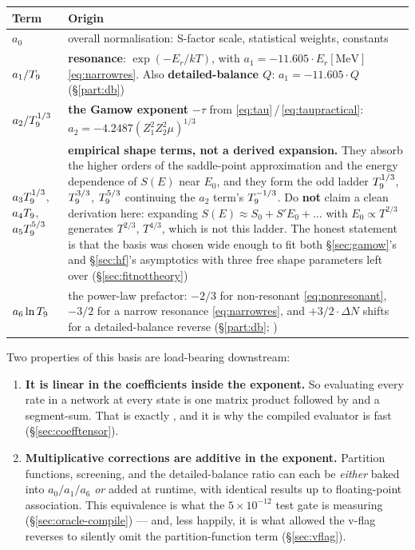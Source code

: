 \begin{center}
\begin{tabularx}{\textwidth}{@{}L{3.1cm} Y@{}}
\toprule
\textbf{Term} & \textbf{Origin} \\
\midrule
$a_0$ & overall normalisation: S-factor scale, statistical weights,
  constants \\
$a_1/T_{9}$ & \textbf{resonance}: $\exp(-E_r/kT)$, with
  $a_1 = -11.605\cdot E_r[\text{MeV}]$ \eqref{eq:narrowres}. Also
  \textbf{detailed-balance $Q$}: $a_1 = -11.605\cdot Q$
  (\S\ref{part:db}) \\
$a_2/T_{9}^{1/3}$ & \textbf{the Gamow exponent} $-\tau$ from
  \eqref{eq:tau}\,/\,\eqref{eq:taupractical}:
  $a_2 = -4.2487(Z_1^2Z_2^2\mu)^{1/3}$ \\
$a_3T_{9}^{1/3}$, $a_4T_{9}$, $a_5T_{9}^{5/3}$ &
  \textbf{empirical shape terms, not a derived expansion.} They absorb the
  higher orders of the saddle-point approximation and the energy dependence of
  $S(E)$ near $E_0$, and they form the odd ladder $T_{9}^{1/3}$, $T_{9}^{3/3}$,
  $T_{9}^{5/3}$ continuing the $a_2$ term's $T_{9}^{-1/3}$. Do \textbf{not} claim a
  clean derivation here: expanding $S(E) \approx S_0 + S'E_0 + \dots$ with
  $E_0 \propto T^{2/3}$ generates $T^{2/3}$, $T^{4/3}$, which is not this
  ladder. The honest statement is that the basis was chosen wide enough to fit
  both \S\ref{sec:gamow}'s and \S\ref{sec:hf}'s asymptotics with three free
  shape parameters left over (\S\ref{sec:fitnottheory}) \\
$a_6\ln T_{9}$ & the power-law prefactor: \textbf{$-2/3$} for non-resonant
  \eqref{eq:nonresonant}, \textbf{$-3/2$} for a narrow resonance
  \eqref{eq:narrowres}, and \textbf{$+3/2\cdot\Delta N$} shifts for a
  detailed-balance reverse (\S\ref{part:db}; \citealp{rauscher2000}) \\
\bottomrule
\end{tabularx}
\end{center}

Two properties of this basis are load-bearing downstream:

\begin{enumerate}
\item \textbf{It is linear in the coefficients inside the exponent.} So
      evaluating every rate in a network at every state is one matrix product
       followed by  and a segment-sum. That is
      exactly , and it is why the compiled
      evaluator is fast (\S\ref{sec:coefftensor}).
\item \textbf{Multiplicative corrections are additive in the exponent.}
      Partition functions, screening, and the detailed-balance ratio can each be
      \emph{either} baked into $a_0/a_1/a_6$ \emph{or} added at runtime, with
      identical results up to floating-point association. This equivalence is
      what the $5\times10^{-12}$ test gate is measuring
      (\S\ref{sec:oracle-compile}) --- and, less happily, it is what allowed the
      v-flag reverses to silently omit the partition-function term
      (\S\ref{sec:vflag}).
\end{enumerate}

